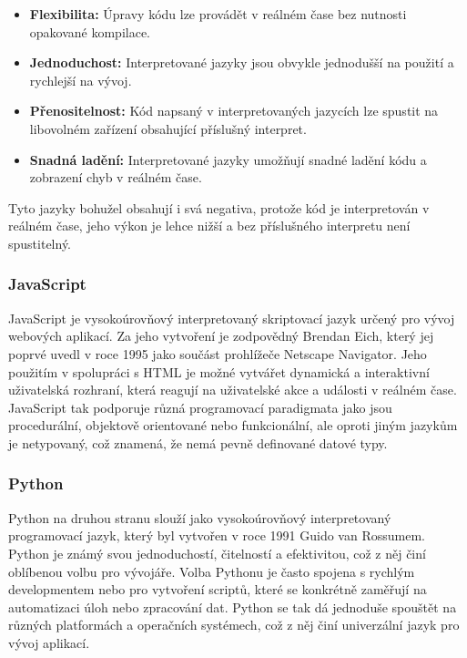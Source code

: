 \begin{itemize}
    \item \textbf{Flexibilita:} Úpravy kódu lze provádět v reálném čase bez nutnosti opakované kompilace.
    \item \textbf{Jednoduchost:} Interpretované jazyky jsou obvykle jednodušší na použití a rychlejší na vývoj.
    \item \textbf{Přenositelnost:} Kód napsaný v interpretovaných jazycích lze spustit na libovolném zařízení obsahující příslušný interpret.
    \item \textbf{Snadná ladění:} Interpretované jazyky umožňují snadné ladění kódu a zobrazení chyb v reálném čase.
\end{itemize}

Tyto jazyky bohužel obsahují i svá negativa, protože kód je interpretován v reálném čase, jeho výkon je lehce nižší a bez příslušného interpretu není spustitelný.

\subsubsection*{JavaScript}
\label{subsubsec:languages-interpreted-javascript}
JavaScript je vysokoúrovňový interpretovaný skriptovací jazyk určený pro vývoj webových aplikací. Za jeho vytvoření je zodpovědný Brendan Eich, který jej poprvé uvedl v roce 1995 jako součást prohlížeče Netscape Navigator. Jeho použitím v spolupráci s HTML je možné vytvářet dynamická a interaktivní uživatelská rozhraní, která reagují na uživatelské akce a události v reálném čase. JavaScript tak podporuje různá programovací paradigmata jako jsou procedurální, objektově orientované nebo funkcionální, ale oproti jiným jazykům je netypovaný, což znamená, že nemá pevně definované datové typy.

\subsubsection*{Python}
\label{subsubsec:languages-interpreted-python}
Python na druhou stranu slouží jako vysokoúrovňový interpretovaný programovací jazyk, který byl vytvořen v roce 1991 Guido van Rossumem. Python je známý svou jednoduchostí, čitelností a efektivitou, což z něj činí oblíbenou volbu pro vývojáře. Volba Pythonu je často spojena s rychlým developmentem nebo pro vytvoření scriptů, které se konkrétně zaměřují na automatizaci úloh nebo zpracování dat. Python se tak dá jednoduše spouštět na různých platformách a operačních systémech, což z něj činí univerzální jazyk pro vývoj aplikací.

